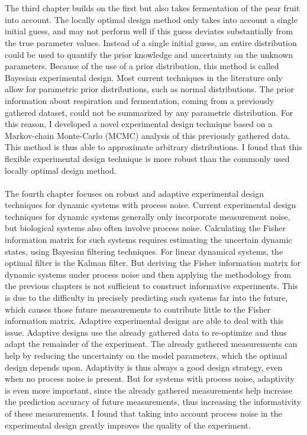 \\
\\
The third chapter builds on the first but also takes fermentation of the pear fruit into account. The locally optimal design method only takes into account a single initial guess, and may not perform well if this guess deviates substantially from the true parameter values. Instead of a single initial guess, an entire distribution could be used to quantify the prior knowledge and uncertainty on the unknown parameters. Because of the use of a prior distribution, this method is called Bayesian experimental design. Most current techniques in the literature only allow for parametric prior distributions, such as normal distributions. The prior information about respiration and fermentation, coming from a previously gathered dataset, could not be summarized by any parametric distribution. For this reason, I developed a novel experimental design technique based on a Markov-chain Monte-Carlo (MCMC) analysis of this previously gathered data. This method is thus able to approximate arbitrary distributions. I found that this flexible experimental design technique is more robust than the commonly used locally optimal design method.
\\
\\
The fourth chapter focuses on robust and adaptive experimental design techniques for dynamic systems with process noise. Current experimental design techniques for dynamic systems generally only incorporate measurement noise, but biological systems also often involve process noise. Calculating the Fisher information matrix for such systems requires estimating the uncertain dynamic states, using Bayesian filtering techniques. For linear dynamical systems, the optimal filter is the Kalman filter. But deriving the Fisher information matrix for dynamic systems under process noise and then applying the methodology from the previous chapters is not sufficient to construct informative experiments. This is due to the difficulty in precisely predicting such systems far into the future, which causes those future measurements to contribute little to the Fisher information matrix. Adaptive experimental designs are able to deal with this issue. Adaptive designs use the already gathered data to re-optimize and thus adapt the remainder of the experiment. The already gathered measurements can help by reducing the uncertainty on the model parameters, which the optimal design depends upon. Adaptivity is thus always a good design strategy, even when no process noise is present. But for systems with process noise, adaptivity is even more important, since the already gathered measurements help increase the prediction accuracy of future measurements, thus increasing the informativity of these measurements. I found that taking into account process noise in the experimental design greatly improves the quality of the experiment.